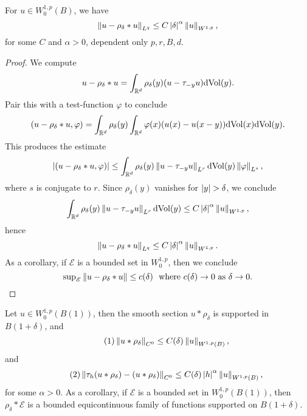 \begin{lemma}
  For $u\in W^{1,p}_{0}(B)$, we have
  \begin{equation*}
    \left\lVert u-\rho_{\delta}\ast u\right\rVert_{L^{q}}\le C\left|\delta\right|^{\alpha}\left\lVert u\right\rVert_{W^{1,p}},    
  \end{equation*}
  for some $C$ and $\alpha>0$, dependent only $p,r,B,d$.
\end{lemma}

\begin{proof}
  We compute
  \begin{equation*}
    u-\rho_{\delta}\ast u=\int_{\mathbb{R}^{d}}\rho_{\delta}(y) (u-\tau_{-y}u)\mathrm{dVol}(y).
  \end{equation*}
  Pair this with a test-function $\varphi$ to conclude
  \begin{equation*}
    (u-\rho_{\delta}\ast u,\varphi)=\int_{\mathbb{R}^{d}}\rho_{\delta}(y)\int_{\mathbb{R}^{d}}\varphi(x)(u(x)-u(x-y))\mathrm{d}\mathrm{Vol}(x)\mathrm{d}\mathrm{Vol}(y).
  \end{equation*}
  This produces the estimate
  \begin{equation*}
    \left|(u-\rho_{\delta}\ast u,\varphi)\right|\le \int_{\mathbb{R}^{d}}\rho_{\delta}(y)\left\lVert u-\tau_{-y}u\right\rVert_{L^{r}}\mathrm{dVol}(y)\left\lVert\varphi\right\rVert_{L^{s}},
  \end{equation*}
  where $s$ is conjugate to $r$. Since $\rho_{\delta}(y)$ vanishes for $\abs{y}>\delta$, we conclude
  \begin{equation*}
    \int_{\mathbb{R}^{d}}\rho_{\delta}(y)\left\lVert u-\tau_{-y}u\right\rVert_{L^{r}}\mathrm{dVol}(y)\le C\left|\delta\right|^{\alpha}\left\lVert u\right\rVert_{W^{1,p}},    
  \end{equation*}
  hence
  \begin{equation*}
    \left\lVert u-\rho_{\delta}\ast u\right\rVert_{L^{q}}\le C\left|\delta\right|^{\alpha}\left\lVert u\right\rVert_{W^{1,p}}.
  \end{equation*}
  As a corollary, if $\mathscr{E}$ is a bounded set in $W^{1,p}_{0}$, then we conclude
  \begin{equation*}
    \text{sup}_{\mathscr{E}}\left\lVert u-\rho_{\delta}\ast u\right\rVert\le c(\delta)\ \ \text{where $c(\delta)\to 0$ as $\delta\to 0$.}
  \end{equation*}
\end{proof}
\begin{lemma}
  Let $u\in W^{1,p}_{0}(B(1))$, then the smooth section $u\ast \rho_{\delta}$ is supported in $B(1+\delta)$, and 
  \begin{equation*}\tag{$1$}
    \left\lVert u\ast \rho_{\delta}\right\rVert_{C^{0}}\le C(\delta)\left\lVert u\right\rVert_{W^{1,p}(B)},
  \end{equation*}
  and 
  \begin{equation*}\tag{$2$}
    \left\lVert\tau_{h}(u\ast \rho_{\delta})-(u\ast \rho_{\delta})\right\rVert_{C^{0}}\le C(\delta) \left|h\right|^{\alpha}\left\lVert u\right\rVert_{W^{1,p}(B)},
  \end{equation*}
  for some $\alpha>0$. As a corollary, if $\mathscr{E}$ is a bounded set in $W^{1,p}_{0}(B(1))$, then $\rho_{\delta}\ast \mathscr{E}$ is a bounded equicontinuous family of functions supported on $B(1+\delta)$.
\end{lemma}
